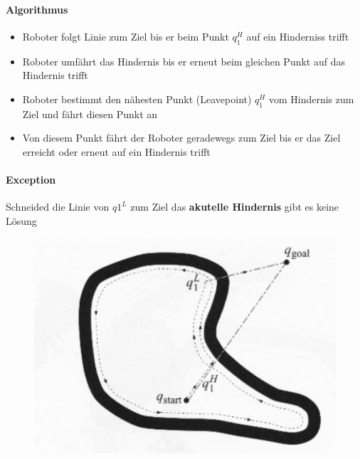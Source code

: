 \paragraph{Algorithmus}
\begin{itemize}
	\item Roboter folgt Linie zum Ziel bis er beim Punkt $q_1^H$ auf ein Hinderniss trifft
	\item Roboter umfährt das Hindernis bis er erneut beim gleichen Punkt auf das Hindernis trifft
	\item Roboter bestimmt den nähesten Punkt (Leavepoint) $q_1^H$ vom Hindernis zum Ziel und fährt diesen Punkt an
	\item Von diesem Punkt fährt der Roboter geradewegs zum Ziel bis er das Ziel erreicht oder erneut auf ein Hindernis trifft
\end{itemize}
\paragraph{Exception}
Schneided die Linie von $q1^L$ zum Ziel das \textbf{akutelle Hindernis} gibt es keine Lösung
\begin{figure}[H]
	\begin{center}
		\includegraphics[scale=0.4]{Resources/PNG/Exception1.PNG}
		\caption{}
		\label{fig:PNG/Exception1.PNG}
	\end{center}
\end{figure}
